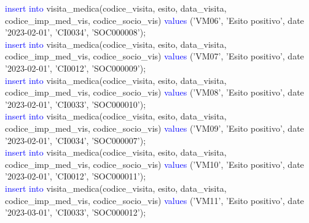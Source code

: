 \documentclass{article}
\begin{document}
\begin{flushleft}
{        \vspace{2mm}
        \hspace*{0.5em}\textcolor{blue}{insert into} visita\_medica(codice\_visita, esito, data\_visita, codice\_imp\_med\_vis, \hspace*{0.5em}codice\_socio\_vis) \textcolor{blue}{values} ('VM06', 'Esito positivo', date '2023-02-01', 'CI0034', \hspace*{0.5em}'SOC000008'); \\
        \vspace{2mm}
        \hspace*{0.5em}\textcolor{blue}{insert into} visita\_medica(codice\_visita, esito, data\_visita, codice\_imp\_med\_vis, \hspace*{0.5em}codice\_socio\_vis) \textcolor{blue}{values} ('VM07', 'Esito positivo', date '2023-02-01', 'CI0012', \hspace*{0.5em}'SOC000009'); \\
        \vspace{2mm}
        \hspace*{0.5em}\textcolor{blue}{insert into} visita\_medica(codice\_visita, esito, data\_visita, codice\_imp\_med\_vis, \hspace*{0.5em}codice\_socio\_vis) \textcolor{blue}{values} ('VM08', 'Esito positivo', date '2023-02-01', 'CI0033', \hspace*{0.5em}'SOC000010'); \\
        \vspace{2mm}
        \hspace*{0.5em}\textcolor{blue}{insert into} visita\_medica(codice\_visita, esito, data\_visita, codice\_imp\_med\_vis, \hspace*{0.5em}codice\_socio\_vis) \textcolor{blue}{values} ('VM09', 'Esito positivo', date '2023-02-01', 'CI0034', \hspace*{0.5em}'SOC000007'); \\
        \vspace{2mm}
        \hspace*{0.5em}\textcolor{blue}{insert into} visita\_medica(codice\_visita, esito, data\_visita, codice\_imp\_med\_vis, \hspace*{0.5em}codice\_socio\_vis) \textcolor{blue}{values} ('VM10', 'Esito positivo', date '2023-02-01', 'CI0012', \hspace*{0.5em}'SOC000011'); \\
        \vspace{2mm}
        \hspace*{0.5em}\textcolor{blue}{insert into} visita\_medica(codice\_visita, esito, data\_visita, codice\_imp\_med\_vis, \hspace*{0.5em}codice\_socio\_vis) \textcolor{blue}{values} ('VM11', 'Esito positivo', date '2023-03-01', 'CI0033', \hspace*{0.5em}'SOC000012'); \\
}
\end{flushleft}
\end{document}
